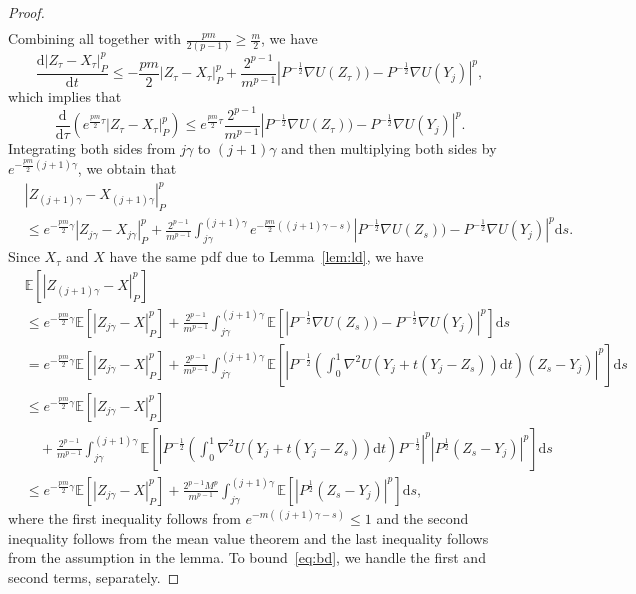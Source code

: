 \documentclass[11pt]{article}
\theoremstyle{plain}
\theoremstyle{definition}
\theoremstyle{remark}
\begin{document}
\begin{proof}
\begin{align*}
\end{align*}
Combining all together with $\frac{pm}{2(p-1)}\geq \frac{m}{2}$, we have
\[
\frac{\mathrm{d} |Z_{\tau} - X_{\tau}|_P^p}{\mathrm{d}t} \leq - \frac{pm}{2}  | Z_{\tau} - X_{\tau}|_P^p + \frac{2^{p-1}}{m^{p-1}} |  P^{-\frac{1}{2}} \nabla U(Z_{\tau})) -P^{-\frac{1}{2}} \nabla U (Y_j) |^p,
\]
which implies that
\[
\frac{\mathrm{d}}{\mathrm{d} {\tau}} (e^{\frac{pm}{2}  {\tau}} | Z_{\tau} - X_{\tau} |_P^p) \leq 
e^{\frac{pm}{2}  {\tau}}\frac{2^{p-1}}{m^{p-1}} |  P^{-\frac{1}{2}} \nabla U(Z_{\tau})) -P^{-\frac{1}{2}} \nabla U (Y_j) |^p.
\]
Integrating both sides from $j\gamma$ to $(j+1)\gamma$ and then multiplying both sides by $e^{-\frac{pm}{2} (j+1) \gamma}$, we obtain that
\begin{align*}
&| Z_{(j+1)\gamma} - X_{(j+1)\gamma} |_P^p\\
&\leq 
e^{-\frac{pm}{2}  \gamma} | Z_{j\gamma} - X_{j\gamma} |_P^p
+\frac{2^{p-1}}{m^{p-1}} \int_{j\gamma}^{(j+1) \gamma} 
e^{-\frac{pm}{2} ( (j+1)\gamma - s)} |  P^{-\frac{1}{2}} \nabla U(Z_s)) -P^{-\frac{1}{2}} \nabla U (Y_j) |^p \mathrm{d} s.
\end{align*}
Since $X_{\tau}$ and $X$ have the same pdf due to Lemma~\ref{lem:ld}, we have
\begin{align}
&\mathbb{E} [| Z_{(j+1)\gamma} - X |^p_P ] \nonumber\\ &\leq 
e^{-\frac{pm}{2} \gamma} \mathbb{E} [ | Z_{j\gamma} - X |_P^p]
+\frac{2^{p-1}}{m^{p-1}} \int_{j\gamma}^{(j+1) \gamma} 
 \mathbb{E} [ |  P^{-\frac{1}{2}} \nabla U(Z_s)) -P^{-\frac{1}{2}} \nabla U (Y_j) |^p ]\mathrm{d} s \nonumber\\
 & = e^{-\frac{pm}{2} \gamma} \mathbb{E} [ | Z_{j\gamma} - X |_P^p]
+\frac{2^{p-1}}{m^{p-1}} \int_{j\gamma}^{(j+1) \gamma} 
 \mathbb{E} [ |  P^{-\frac{1}{2}} (\int_0^1 \nabla^2 U(Y_j + t(Y_j-Z_s))\mathrm{d}t)(Z_s-Y_j)  |^p ]\mathrm{d} s \nonumber\\
 & \leq e^{-\frac{pm}{2} \gamma} \mathbb{E} [ | Z_{j\gamma} - X |_P^p] \nonumber\\
&\quad +\frac{2^{p-1}}{m^{p-1}} \int_{j\gamma}^{(j+1) \gamma} 
 \mathbb{E} [ |  P^{-\frac{1}{2}} (\int_0^1 \nabla^2 U(Y_j + t(Y_j-Z_s))\mathrm{d}t)P^{-\frac{1}{2}}|^p|P^{\frac{1}{2}}(Z_s-Y_j)  |^p ]\mathrm{d} s \nonumber\\
 &\leq e^{-\frac{pm}{2}  \gamma} \mathbb{E} [ | Z_{j\gamma} - X |_P^p]
+\frac{2^{p-1}M^{p}}{m^{p-1}} \int_{j\gamma}^{(j+1) \gamma} 
\mathbb{E} [ | P^{\frac{1}{2}}(Z_s-Y_j) |^p ] \mathrm{d} s,\label{eq:bd}
\end{align}
where the first inequality follows from $e^{-m ( (j+1)\gamma - s)}  \leq 1$ and the second inequality follows from the mean value theorem and the last inequality follows from the assumption in the lemma. 
To bound~\eqref{eq:bd}, we handle the first and second terms, separately. 


\end{proof}
\end{document}
